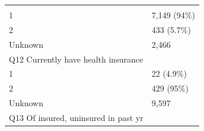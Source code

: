 \documentclass[]{article}
\begin{document}
\begin{longtable}[]{@{}ll@{}}
\begin{minipage}[t]{0.23\columnwidth}
\strut
\end{minipage}\tabularnewline
\begin{minipage}[t]{0.71\columnwidth}\raggedright
1\strut
\end{minipage} & \begin{minipage}[t]{0.23\columnwidth}\raggedright
7,149 (94\%)\strut
\end{minipage}\tabularnewline
\begin{minipage}[t]{0.71\columnwidth}\raggedright
2\strut
\end{minipage} & \begin{minipage}[t]{0.23\columnwidth}\raggedright
433 (5.7\%)\strut
\end{minipage}\tabularnewline
\begin{minipage}[t]{0.71\columnwidth}\raggedright
Unknown\strut
\end{minipage} & \begin{minipage}[t]{0.23\columnwidth}\raggedright
2,466\strut
\end{minipage}\tabularnewline
\begin{minipage}[t]{0.71\columnwidth}\raggedright
Q12 Currently have health insurance\strut
\end{minipage} & \begin{minipage}[t]{0.23\columnwidth}\raggedright
\strut
\end{minipage}\tabularnewline
\begin{minipage}[t]{0.71\columnwidth}\raggedright
1\strut
\end{minipage} & \begin{minipage}[t]{0.23\columnwidth}\raggedright
22 (4.9\%)\strut
\end{minipage}\tabularnewline
\begin{minipage}[t]{0.71\columnwidth}\raggedright
2\strut
\end{minipage} & \begin{minipage}[t]{0.23\columnwidth}\raggedright
429 (95\%)\strut
\end{minipage}\tabularnewline
\begin{minipage}[t]{0.71\columnwidth}\raggedright
Unknown\strut
\end{minipage} & \begin{minipage}[t]{0.23\columnwidth}\raggedright
9,597\strut
\end{minipage}\tabularnewline
\begin{minipage}[t]{0.71\columnwidth}\raggedright
Q13 Of insured, uninsured in past yr\strut
\end{minipage} & \begin{minipage}[t]{0.23\columnwidth}\raggedright

\end{minipage}
\end{longtable}
\end{document}
